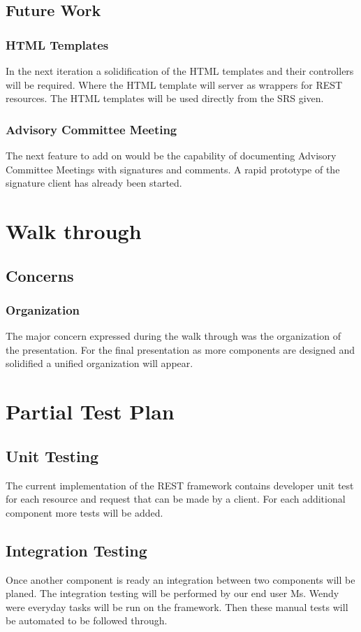 \documentclass[11pt,a4paper]{report}
\begin{document}
\section{Future Work}
\subsection{HTML Templates}
In the next iteration a solidification of the HTML templates and their controllers will be required. Where the HTML template will server as wrappers for REST resources. The HTML templates will be used directly from the SRS given. 

\subsection{Advisory Committee Meeting}
The next feature to add on would be the capability of documenting Advisory Committee Meetings with signatures and comments. A rapid prototype of the signature client has already been started. 

\chapter{Walk through}
\section{Concerns}
\subsection{Organization}
The major concern expressed during the walk through was the organization of the presentation. For the final presentation as more components are designed and solidified a unified organization will appear. 
\chapter{Partial Test Plan}
\section{Unit Testing}
The current implementation of the REST framework contains developer unit test for each resource and request that can be made by a client. For each additional component more tests will be added. 
\section{Integration Testing}
Once another component is ready an integration between two components will be planed. The integration testing will be performed by our end user Ms. Wendy were everyday tasks will be run on the framework. Then these manual tests will be automated to be followed through. 
\end{document}
